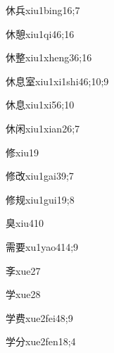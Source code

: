 \begin{verbete}{休兵}{xiu1bing1}{6;7}
\end{verbete}
\begin{verbete}{休憩}{xiu1qi4}{6;16}
\end{verbete}
\begin{verbete}{休整}{xiu1xheng3}{6;16}
\end{verbete}
\begin{verbete}{休息室}{xiu1xi1shi4}{6;10;9}
\end{verbete}
\begin{verbete}{休息}{xiu1xi5}{6;10}
\end{verbete}
\begin{verbete}{休闲}{xiu1xian2}{6;7}
\end{verbete}
\begin{verbete}{修}{xiu1}{9}
\end{verbete}
\begin{verbete}{修改}{xiu1gai3}{9;7}
\end{verbete}
\begin{verbete}{修规}{xiu1gui1}{9;8}
\end{verbete}
\begin{verbete}{臭}{xiu4}{10}
\end{verbete}
\begin{verbete}{需要}{xu1yao4}{14;9}
\end{verbete}
\begin{verbete}{斈}{xue2}{7}
\end{verbete}
\begin{verbete}{学}{xue2}{8}
\end{verbete}
\begin{verbete}{学费}{xue2fei4}{8;9}
\end{verbete}
\begin{verbete}{学分}{xue2fen1}{8;4}
\end{verbete}
